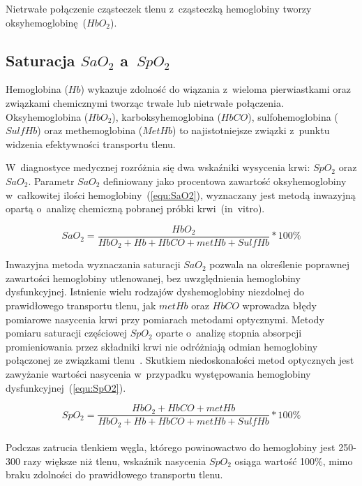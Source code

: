 \noindent Nietrwałe połączenie cząsteczek tlenu z~cząsteczką hemoglobiny tworzy oksyhemoglobinę~($HbO_{2}$).

\subsection{Saturacja $SaO_{2}$ a~$SpO_{2}$}
\label{subsec:Saturacja}

Hemoglobina ($Hb$) wykazuje zdolność do wiązania z~wieloma pierwiastkami oraz związkami chemicznymi tworząc trwałe lub nietrwałe połączenia. 
Oksyhemoglobina ($HbO_{2}$), karboksyhemoglobina ($HbCO$), sulfohemoglobina ($SulfHb$) oraz methemoglobina ($MetHb$) to najistotniejsze związki 
z~punktu widzenia efektywności transportu tlenu. 

W~diagnostyce medycznej rozróżnia się dwa wskaźniki wysycenia krwi: $SpO_{2}$ oraz $SaO_{2}$. 
Parametr $SaO_{2}$ definiowany jako procentowa zawartość oksyhemoglobiny w~całkowitej ilości hemoglobiny~(\ref{equ:SaO2}), 
wyznaczany jest metodą inwazyjną opartą o~analizę chemiczną pobranej próbki krwi~(in~vitro).

\begin{equation}
\label{equ:SaO2}
	SaO_{2} = \frac{HbO_{2}}{HbO_{2} + Hb + HbCO + metHb + SulfHb} * 100\%
\end{equation}

Inwazyjna metoda wyznaczania saturacji $SaO_{2}$ pozwala na określenie poprawnej zawartości hemoglobiny utlenowanej, bez uwzględnienia hemoglobiny 
dysfunkcyjnej. Istnienie wielu rodzajów dyshemoglobiny niezdolnej do prawidłowego transportu tlenu, jak $metHb$ oraz $HbCO$ wprowadza błędy pomiarowe
nasycenia krwi przy pomiarach metodami optycznymi. Metody pomiaru saturacji częściowej $SpO_{2}$ oparte o~analizę stopnia absorpcji promieniowania 
przez składniki krwi nie odróżniają odmian hemoglobiny połączonej ze związkami tlenu~\cite{Fizj:2007}. Skutkiem niedoskonałości metod optycznych jest
zawyżanie wartości nasycenia w~przypadku występowania hemoglobiny dysfunkcyjnej~(\ref{equ:SpO2}). 

\begin{equation}
\label{equ:SpO2}
	SpO_{2} = \frac{HbO_{2} + HbCO + metHb}{HbO_{2} + Hb + HbCO + metHb + SulfHb} * 100\%
\end{equation}
\\
\noindent Podczas zatrucia tlenkiem węgla, którego powinowactwo do hemoglobiny jest 250-300 razy większe niż tlenu, wskaźnik nasycenia $SpO_{2}$ 
osiąga wartość 100\%, mimo braku zdolności do prawidłowego transportu tlenu. 

